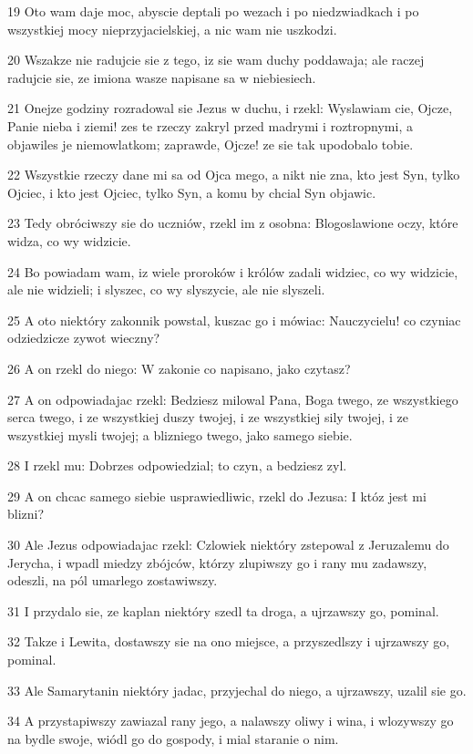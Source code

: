 \par 19 Oto wam daje moc, abyscie deptali po wezach i po niedzwiadkach i po wszystkiej mocy nieprzyjacielskiej, a nic wam nie uszkodzi.
\par 20 Wszakze nie radujcie sie z tego, iz sie wam duchy poddawaja; ale raczej radujcie sie, ze imiona wasze napisane sa w niebiesiech.
\par 21 Onejze godziny rozradowal sie Jezus w duchu, i rzekl: Wyslawiam cie, Ojcze, Panie nieba i ziemi! zes te rzeczy zakryl przed madrymi i roztropnymi, a objawiles je niemowlatkom; zaprawde, Ojcze! ze sie tak upodobalo tobie.
\par 22 Wszystkie rzeczy dane mi sa od Ojca mego, a nikt nie zna, kto jest Syn, tylko Ojciec, i kto jest Ojciec, tylko Syn, a komu by chcial Syn objawic.
\par 23 Tedy obróciwszy sie do uczniów, rzekl im z osobna: Blogoslawione oczy, które widza, co wy widzicie.
\par 24 Bo powiadam wam, iz wiele proroków i królów zadali widziec, co wy widzicie, ale nie widzieli; i slyszec, co wy slyszycie, ale nie slyszeli.
\par 25 A oto niektóry zakonnik powstal, kuszac go i mówiac: Nauczycielu! co czyniac odziedzicze zywot wieczny?
\par 26 A on rzekl do niego: W zakonie co napisano, jako czytasz?
\par 27 A on odpowiadajac rzekl: Bedziesz milowal Pana, Boga twego, ze wszystkiego serca twego, i ze wszystkiej duszy twojej, i ze wszystkiej sily twojej, i ze wszystkiej mysli twojej; a blizniego twego, jako samego siebie.
\par 28 I rzekl mu: Dobrzes odpowiedzial; to czyn, a bedziesz zyl.
\par 29 A on chcac samego siebie usprawiedliwic, rzekl do Jezusa: I któz jest mi blizni?
\par 30 Ale Jezus odpowiadajac rzekl: Czlowiek niektóry zstepowal z Jeruzalemu do Jerycha, i wpadl miedzy zbójców, którzy zlupiwszy go i rany mu zadawszy, odeszli, na pól umarlego zostawiwszy.
\par 31 I przydalo sie, ze kaplan niektóry szedl ta droga, a ujrzawszy go, pominal.
\par 32 Takze i Lewita, dostawszy sie na ono miejsce, a przyszedlszy i ujrzawszy go, pominal.
\par 33 Ale Samarytanin niektóry jadac, przyjechal do niego, a ujrzawszy, uzalil sie go.
\par 34 A przystapiwszy zawiazal rany jego, a nalawszy oliwy i wina, i wlozywszy go na bydle swoje, wiódl go do gospody, i mial staranie o nim.
